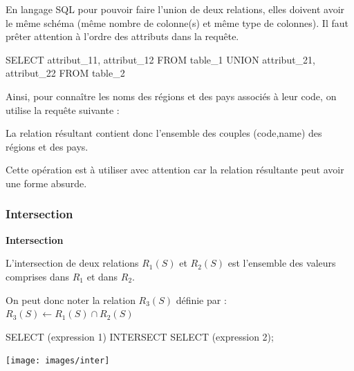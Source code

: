 \documentclass[10pt]{article}
\newif\ifprofvar
\begin{document}
\begin{envsql}
En langage SQL pour pouvoir faire l'union de deux relations, elles doivent avoir le même schéma (même nombre de colonne(s) et même type de colonnes). Il faut prêter attention à l'ordre des attributs dans la requête. 

\begin{sql}
SELECT  attribut_11, attribut_12 FROM table_1 UNION attribut_21, attribut_22 FROM table_2
\end{sql}
\end{envsql}

\begin{exemple}
Ainsi, pour connaître les noms des régions et des pays associés à leur code, on utilise la requête suivante :

\ifprofvar
\begin{envsql}
\begin{sql}
SELECT code,name FROM Countries UNION SELECT code,name FROM Regions;
\end{sql}
\end{envsql}
\else
\vspace{3cm}
\fi

La relation résultant contient donc l'ensemble des couples (code,name) des régions et des  pays. 
\end{exemple}

\begin{rem}
Cette opération est à utiliser avec attention car la relation résultante peut avoir une forme absurde.
\end{rem}

\subsubsection{Intersection}
\begin{defi}
\begin{minipage}[c]{.75\linewidth}
\textbf{Intersection}

L'intersection de deux relations $R_1(S)$ et $R_2(S)$ est l'ensemble des valeurs comprises dans $R_1$ et dans $R_2$. 

On peut donc noter la relation $R_3(S)$ définie par : $R_3(S)\leftarrow R_1(S)\cap R_2(S)$

\begin{envsql}
\begin{sql}
SELECT  (expression 1) INTERSECT SELECT (expression 2);
\end{sql}
\end{envsql}
\end{minipage}\hfill
\begin{minipage}[c]{.2\linewidth}
\begin{center}
\texttt{[image: images/inter]}
\end{center}
\end{minipage}
\end{defi}
\end{document}
